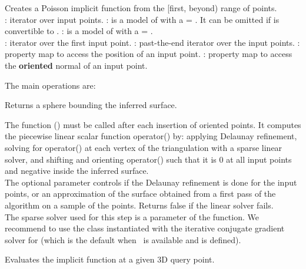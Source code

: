 {
Creates a Poisson implicit function from the [first, beyond) range of points.
  \\
: iterator over input points. : is a model of  with a  = . It can be omitted if   is convertible to . : is a model of  with a  = .
  \\
: iterator over the first input point. : past-the-end iterator over the input points. : property map to access the position of an input point. : property map to access the {\bf oriented} normal of an input point.
}

The main operations are:

{
Returns a sphere bounding the inferred surface.
}

{
The function () must be called after each insertion of oriented points. It computes the piecewise linear scalar function operator() by: applying Delaunay refinement, solving for operator() at each vertex of the triangulation with a sparse linear solver, and shifting and orienting operator() such that it is 0 at all input points and negative inside the inferred surface.  \\
The optional parameter  controls if the Delaunay refinement is done for the input points, or an approximation of the surface obtained from a first pass of the algorithm on a sample of the points.
Returns false if the linear solver fails.\\
The sparse solver used for this step is a parameter of the function. We recommend to use the class 
instantiated with the iterative conjugate gradient solver  for  (which is the default when \ccThirdPartyEigen\ is available and  is defined).
}

{
Evaluates the implicit function at a given 3D query point.
}

